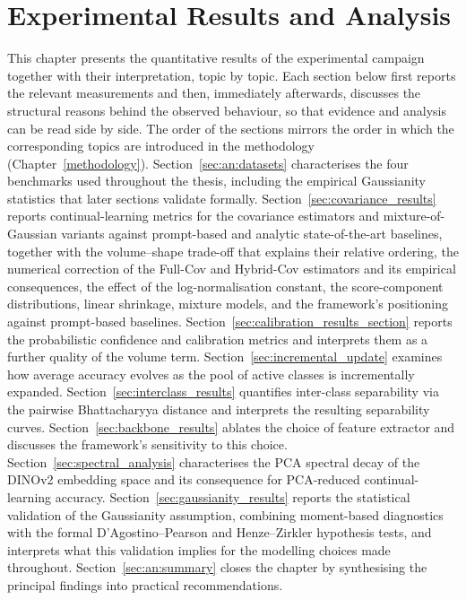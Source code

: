 \chapter{Experimental Results and Analysis}
\label{ch:results}
\label{ch:analysis}

This chapter presents the quantitative results of the experimental campaign together with their interpretation, topic by topic. Each section below first reports the relevant measurements and then, immediately afterwards, discusses the structural reasons behind the observed behaviour, so that evidence and analysis can be read side by side. The order of the sections mirrors the order in which the corresponding topics are introduced in the methodology (Chapter~\ref{methodology}). Section~\ref{sec:an:datasets} characterises the four benchmarks used throughout the thesis, including the empirical Gaussianity statistics that later sections validate formally. Section~\ref{sec:covariance_results} reports continual-learning metrics for the covariance estimators and mixture-of-Gaussian variants against prompt-based and analytic state-of-the-art baselines, together with the volume--shape trade-off that explains their relative ordering, the numerical correction of the Full-Cov and Hybrid-Cov estimators and its empirical consequences, the effect of the log-normalisation constant, the score-component distributions, linear shrinkage, mixture models, and the framework's positioning against prompt-based baselines. Section~\ref{sec:calibration_results_section} reports the probabilistic confidence and calibration metrics and interprets them as a further quality of the volume term. Section~\ref{sec:incremental_update} examines how average accuracy evolves as the pool of active classes is incrementally expanded. Section~\ref{sec:interclass_results} quantifies inter-class separability via the pairwise Bhattacharyya distance and interprets the resulting separability curves. Section~\ref{sec:backbone_results} ablates the choice of feature extractor and discusses the framework's sensitivity to this choice. Section~\ref{sec:spectral_analysis} characterises the PCA spectral decay of the DINOv2 embedding space and its consequence for PCA-reduced continual-learning accuracy. Section~\ref{sec:gaussianity_results} reports the statistical validation of the Gaussianity assumption, combining moment-based diagnostics with the formal D'Agostino--Pearson and Henze--Zirkler hypothesis tests, and interprets what this validation implies for the modelling choices made throughout. Section~\ref{sec:an:summary} closes the chapter by synthesising the principal findings into practical recommendations.

